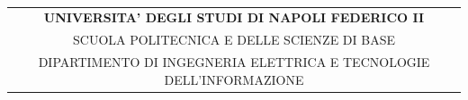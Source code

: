\documentclass[a4paper,italian,10pt,openany]{book}
\begin{document}
\clearpage
\newcommand\nbvspace[1][3]{\vspace*{\stretch{#1}}}
\newcommand\nbstretchyspace{\spaceskip0.5em plus 0.25em minus 0.25em}
\begin{titlepage}
\begin{center}
\tt
\nbvspace[0.03]
\begin{tabular}[c]{@{}c@{}}\vspace{0.1cm}\textbf{\LARGE{UNIVERSITA' DEGLI STUDI DI NAPOLI FEDERICO II}}\\\vspace{0.1cm}\Large{SCUOLA POLITECNICA E DELLE SCIENZE DI BASE}\\\large{DIPARTIMENTO DI INGEGNERIA ELETTRICA E TECNOLOGIE DELL'INFORMAZIONE}\end{tabular}


\end{center}
\end{titlepage}
\end{document}
